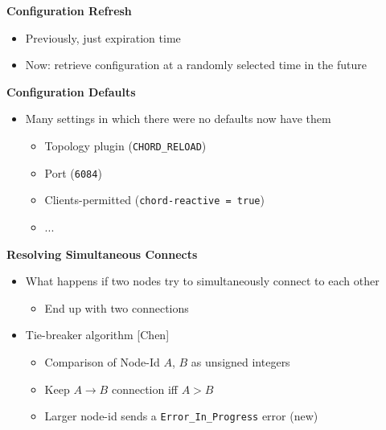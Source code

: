 \documentclass[helvetica]{seminar}
\newcommand{\heading}[1]{%
  \begin{center} 
    \large\bf 
    #1 
  \end{center} 
  \vspace{.4 in}}
\begin{document}
\begin{slide}
\heading{Configuration Refresh}

\begin{itemize}
\item Previously, just expiration time
\item Now: retrieve configuration at a randomly selected time in the future
\end{itemize}
\end{slide}



\begin{slide}
\heading{Configuration Defaults}

\begin{itemize}
\item Many settings in which there were no defaults now have them
  \begin{itemize}
  \item Topology plugin (\verb^CHORD_RELOAD^)
  \item Port (\verb^6084^)
  \item Clients-permitted (\verb^chord-reactive = true^)
   \item ...
  \end{itemize}
\end{itemize}
\end{slide}


\begin{slide}
\heading{Resolving Simultaneous Connects}

\begin{itemize}
\item What happens if two nodes try to simultaneously connect to each other
  \begin{itemize}
  \item End up with two connections
  \end{itemize}

\item Tie-breaker algorithm [Chen]
  \begin{itemize}
  \item Comparison of Node-Id $A$, $B$ as unsigned integers 
  \item Keep $A \rightarrow B$ connection iff $A > B$
  \item Larger node-id sends a \verb^Error_In_Progress^ error (new)
  \end{itemize}
\end{itemize}

\end{slide}
\end{document}
